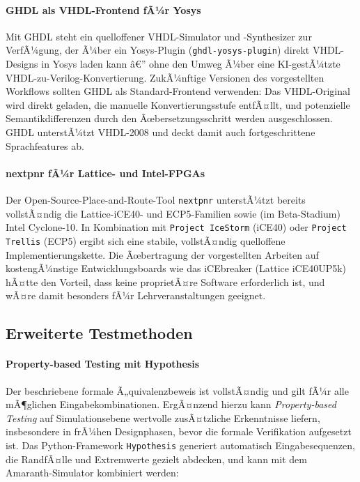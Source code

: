 ﻿\documentclass[12pt,a4paper]{report}
\begin{document}
\paragraph{GHDL als VHDL-Frontend fÃ¼r Yosys}
Mit GHDL \cite{ghdl2024} steht ein quelloffener VHDL-Simulator und -Synthesizer zur
VerfÃ¼gung, der Ã¼ber ein Yosys-Plugin (\texttt{ghdl-yosys-plugin}) direkt VHDL-Designs
in Yosys laden kann â€” ohne den Umweg Ã¼ber eine KI-gestÃ¼tzte VHDL-zu-Verilog-Konvertierung.
ZukÃ¼nftige Versionen des vorgestellten Workflows sollten GHDL als Standard-Frontend
verwenden: Das VHDL-Original wird direkt geladen, die manuelle Konvertierungsstufe
entfÃ¤llt, und potenzielle Semantikdifferenzen durch den Ãœbersetzungsschritt werden
ausgeschlossen. GHDL unterstÃ¼tzt VHDL-2008 und deckt damit auch fortgeschrittene
Sprachfeatures ab.

\paragraph{nextpnr fÃ¼r Lattice- und Intel-FPGAs}
Der Open-Source-Place-and-Route-Tool \texttt{nextpnr} unterstÃ¼tzt bereits vollstÃ¤ndig die
Lattice-iCE40- und ECP5-Familien sowie (im Beta-Stadium) Intel Cyclone-10. In Kombination
mit \texttt{Project IceStorm} (iCE40) oder \texttt{Project Trellis} (ECP5) ergibt sich
eine stabile, vollstÃ¤ndig quelloffene Implementierungskette. Die Ãœbertragung der
vorgestellten Arbeiten auf kostengÃ¼nstige Entwicklungsboards wie das iCEbreaker
(Lattice iCE40UP5k) hÃ¤tte den Vorteil, dass keine proprietÃ¤re Software
erforderlich ist, und wÃ¤re damit besonders fÃ¼r Lehrveranstaltungen geeignet.

\subsection{Erweiterte Testmethoden}

\paragraph{Property-based Testing mit Hypothesis}
Der beschriebene formale Ã„quivalenzbeweis ist vollstÃ¤ndig und gilt fÃ¼r alle mÃ¶glichen
Eingabekombinationen. ErgÃ¤nzend hierzu kann \textit{Property-based Testing} auf
Simulationsebene wertvolle zusÃ¤tzliche Erkenntnisse liefern, insbesondere in frÃ¼hen
Designphasen, bevor die formale Verifikation aufgesetzt ist. Das Python-Framework
\texttt{Hypothesis} \cite{hypothesis2024} generiert automatisch Eingabesequenzen, die
RandfÃ¤lle und Extremwerte gezielt abdecken, und kann mit dem Amaranth-Simulator
kombiniert werden:
\end{document}
